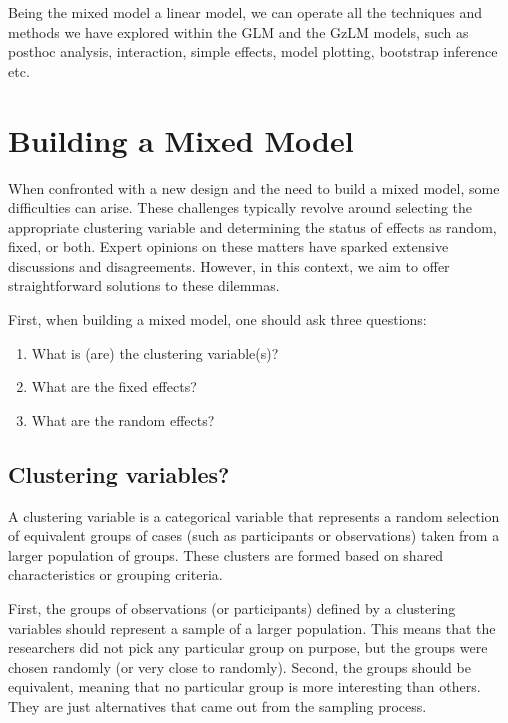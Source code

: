 \documentclass[
]{book}
\providecommand{\tightlist}{%
  \setlength{\itemsep}{0pt}\setlength{\parskip}{0pt}}
\begin{document}
Being the mixed model a linear model, we can operate all the techniques and methods we have explored within the GLM and the GzLM models, such as posthoc analysis, interaction, simple effects, model plotting, bootstrap inference etc.

\hypertarget{building-a-mixed-model}{%
\section{Building a Mixed Model}\label{building-a-mixed-model}}

When confronted with a new design and the need to build a mixed model, some difficulties can arise. These challenges typically revolve around selecting the appropriate clustering variable and determining the status of effects as random, fixed, or both. Expert opinions on these matters have sparked extensive discussions and disagreements. However, in this context, we aim to offer straightforward solutions to these dilemmas.

First, when building a mixed model, one should ask three questions:

\begin{enumerate}
\def\labelenumi{\arabic{enumi})}
\tightlist
\item
  What is (are) the clustering variable(s)?
\item
  What are the fixed effects?
\item
  What are the random effects?
\end{enumerate}

\hypertarget{clustering-variables}{%
\subsection{Clustering variables?}\label{clustering-variables}}

A clustering variable is a categorical variable that represents a random selection of equivalent groups of cases (such as participants or observations) taken from a larger population of groups. These clusters are formed based on shared characteristics or grouping criteria.

First, the groups of observations (or participants) defined by a clustering variables should represent a sample of a larger population. This means that the researchers did not pick any particular group on purpose, but the groups were chosen randomly (or very close to randomly). Second, the groups should be equivalent, meaning that no particular group is more interesting than others. They are just alternatives that came out from the sampling process.
\end{document}
